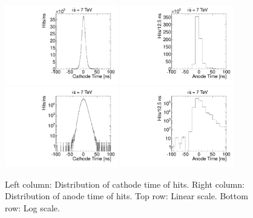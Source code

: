 \begin{figure}
  \begin{center}
      \includegraphics[clip=true, trim=0.0cm 0cm 2.0cm 0cm, width=0.44\textwidth]{figures/timing/CathodeTime}
      \includegraphics[clip=true, trim=0.0cm 0cm 2.0cm 0cm, width=0.44\textwidth]{figures/timing/AnodeTime} \\
      \includegraphics[clip=true, trim=0.0cm 0cm 2.0cm 0cm, width=0.44\textwidth]{figures/timing/CathodeTimeLog}
      \includegraphics[clip=true, trim=0.0cm 0cm 2.0cm 0cm, width=0.44\textwidth]{figures/timing/AnodeTimeLog} \\
      \renewcommand\baselinestretch{1}\caption[Gluino1200f100 System Pt vs MET]
      {Left column: Distribution of cathode time of hits. Right column: Distribution of anode time of hits. Top row: Linear scale. Bottom row: Log scale.
	}
      \renewcommand\baselinestretch{\@spacing}
      \label{fig:hittime}
  \end{center}
\end{figure}

